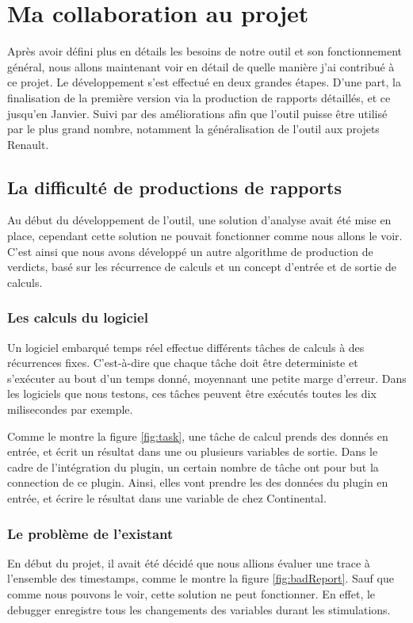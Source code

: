 \chapter{Ma collaboration au projet}\label{collab}
\putminitoc
Après avoir défini plus en détails les besoins de notre outil et son fonctionnement général, nous allons maintenant voir en détail de quelle manière j'ai contribué à ce projet. Le développement s'est effectué en deux grandes étapes. D'une part, la finalisation de la première version via la production de rapports détaillés, et ce jusqu'en Janvier. Suivi par des améliorations afin que l'outil puisse être utilisé par le plus grand nombre, notamment la généralisation de l'outil aux projets Renault. 

\section{La difficulté de productions de rapports}
Au début du développement de l'outil, une solution d'analyse avait été mise en place, cependant cette solution ne pouvait fonctionner comme nous allons le voir. C'est ainsi que nous avons développé un autre algorithme de production de verdicts, basé sur les récurrence de calculs et un concept d'entrée et de sortie de calculs. 

\subsection{Les calculs du logiciel}
	Un logiciel embarqué temps réel effectue différents tâches de calculs à des récurrences fixes. C'est-à-dire que chaque tâche doit être deterministe et s'exécuter au bout d'un temps donné, moyennant une petite marge d'erreur. Dans les logiciels que nous testons, ces tâches peuvent être exécutés toutes les dix milisecondes par exemple. 
	

	Comme le montre la figure \ref{fig:task}, une tâche de calcul prends des donnés en entrée, et écrit un résultat dans une ou plusieurs variables de sortie. Dans le cadre de l'intégration du plugin, un certain nombre de tâche ont pour but la connection de ce plugin. Ainsi, elles vont prendre les des données du plugin en entrée, et écrire le résultat dans une variable de chez Continental. 

\subsection{Le problème de l'existant}
En début du projet, il avait été décidé que nous allions évaluer une trace à l'ensemble des timestamps, comme le montre la figure \ref{fig:badReport}. Sauf que comme nous pouvons le voir, cette solution ne peut fonctionner. En effet, le debugger enregistre tous les changements des variables durant les stimulations. 


